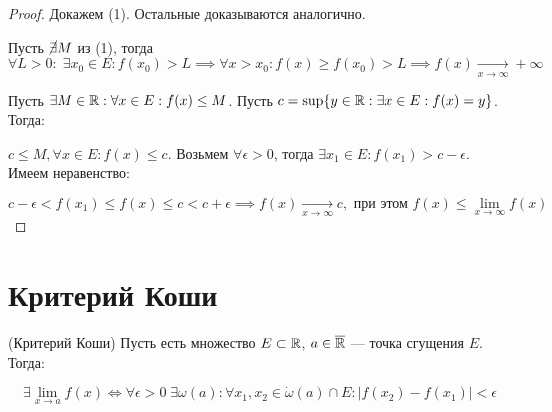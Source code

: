 \begin{proof}
    Докажем (1). Остальные доказываются аналогично.

    Пусть $\cancel{\exists} M$ из (1), тогда $\forall L > 0: \; \exists x_0 \in E: f(x_0) > L \implies \forall x > x_0: f(x) \geq f(x_0) > L \implies f(x) \underset{x \to \infty}{\to} +\infty$

    Пусть $\exists M \in \mathbb{R}: \forall x \in E: f(x) \leq M$. Пусть $c = \sup\{y \in \mathbb{R}: \exists x \in E: f(x) = y\}$. Тогда:

    $c \leq M, \forall x \in E: f(x) \leq c$. Возьмем $\forall \epsilon > 0$, тогда $\exists x_1 \in E: f(x_1) > c - \epsilon$. Имеем неравенство:

    $$c - \epsilon < f(x_1) \leq f(x) \leq c < c + \epsilon \implies f(x) \underset{x \to \infty}{\to} c, \text{ при этом } f(x) \leq \lim\limits_{x \to \infty} f(x)$$
\end{proof}

\section{Критерий Коши}

\begin{theorem} (Критерий Коши)
    Пусть есть множество $E \subset \mathbb{R}$, $a \in \overline{\mathbb{R}}$ --- точка сгущения $E$. Тогда:

    $$\exists \lim\limits_{x \to a} f(x) \Leftrightarrow \forall \epsilon > 0 \; \exists \omega(a): \forall x_1, x_2 \in \dot{\omega}(a) \cap E: |f(x_2) - f(x_1)| < \epsilon$$
\end{theorem}

